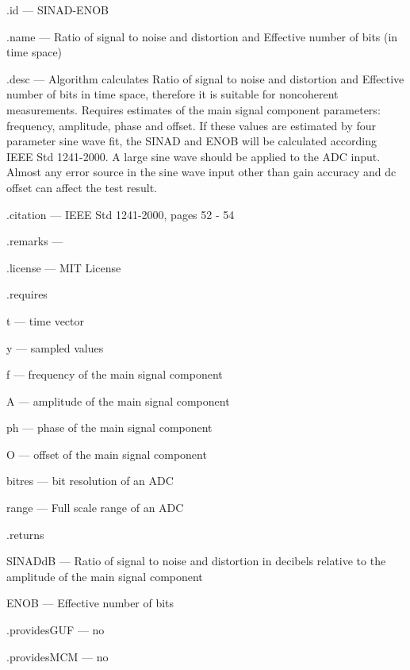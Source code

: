 \begin{tightdesc}
\item [\textsf{.id}] --- SINAD-ENOB
\item [\textsf{.name}] --- Ratio of signal to noise and distortion and Effective number of bits (in time space)
\item [\textsf{.desc}] ---  Algorithm calculates Ratio of signal to noise and distortion and Effective number of bits in time space, therefore it is suitable for noncoherent measurements. Requires estimates of the main signal component parameters: frequency, amplitude, phase and offset. If these values are estimated by four parameter sine wave fit, the SINAD and ENOB will be calculated according IEEE Std 1241-2000. A large sine wave should be applied to the ADC input. Almost any error source in the sine wave input other than gain accuracy and dc offset can affect the test result.
\item [\textsf{.citation}] --- IEEE Std 1241-2000, pages 52 - 54
\item [\textsf{.remarks}] --- 
\item [\textsf{.license}] --- MIT License
\item [\textsf{.requires}] \rule{0em}{0em}
\begin{tightdesc}
\item [\textsf{t}] --- time vector
\item [\textsf{y}] --- sampled values
\item [\textsf{f}] --- frequency of the main signal component
\item [\textsf{A}] --- amplitude of the main signal component
\item [\textsf{ph}] --- phase of the main signal component
\item [\textsf{O}] --- offset of the main signal component
\item [\textsf{bitres}] --- bit resolution of an ADC
\item [\textsf{range}] --- Full scale range of an ADC
\end{tightdesc}
\item [\textsf{.returns}] \rule{0em}{0em}
\begin{tightdesc}
\item [\textsf{SINADdB}] --- Ratio of signal to noise and distortion in decibels relative to the amplitude of the main signal component 
\item [\textsf{ENOB}] --- Effective number of bits
\end{tightdesc}
\item [\textsf{.providesGUF}] --- no
\item [\textsf{.providesMCM}] ---  no
\end{tightdesc}
